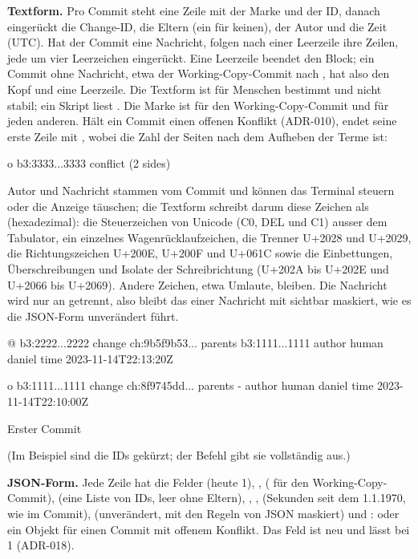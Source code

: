 {\bf Textform.} Pro Commit steht eine Zeile mit der Marke und der ID, danach eingerückt die
Change-ID, die Eltern (ein \type{-} für keinen), der Autor und die Zeit (UTC).
Hat der Commit eine Nachricht, folgen nach einer Leerzeile ihre Zeilen,
jede um vier Leerzeichen eingerückt. Eine Leerzeile beendet den Block;
ein Commit ohne Nachricht, etwa der Working-Copy-Commit nach ,
hat also den Kopf und eine Leerzeile.
Die Textform ist für Menschen bestimmt und nicht stabil; ein Skript liest .
Die Marke ist  für den Working-Copy-Commit und  für jeden anderen.
Hält ein Commit einen offenen Konflikt (ADR-010), endet seine erste Zeile mit
, wobei  die Zahl der Seiten nach dem Aufheben der Terme ist:

\starttyping
o b3:3333...3333 conflict (2 sides)
\stoptyping

Autor und Nachricht stammen vom Commit und können das Terminal steuern oder die Anzeige
täuschen; die Textform schreibt darum diese Zeichen als  (hexadezimal):
die Steuerzeichen von Unicode (C0, DEL und C1) ausser dem Tabulator, ein einzelnes
Wagenrücklaufzeichen, die Trenner U+2028 und U+2029, die Richtungszeichen U+200E, U+200F
und U+061C sowie die Einbettungen, Überschreibungen und Isolate der Schreibrichtung
(U+202A bis U+202E und U+2066 bis U+2069). Andere Zeichen, etwa Umlaute, bleiben.
Die Nachricht wird nur an \type{\n} getrennt, also bleibt das \type{\r} einer Nachricht
mit \type{\r\n} sichtbar maskiert, wie es die JSON-Form unverändert führt.

\starttyping
@ b3:2222...2222
  change   ch:9b5f9b53...
  parents  b3:1111...1111
  author   human daniel
  time     2023-11-14T22:13:20Z

o b3:1111...1111
  change   ch:8f9745dd...
  parents  -
  author   human daniel
  time     2023-11-14T22:10:00Z

    Erster Commit

\stoptyping

(Im Beispiel sind die IDs gekürzt; der Befehl gibt sie vollständig aus.)

{\bf JSON-Form.} Jede Zeile hat die Felder  (heute 1), ,
 ( für den Working-Copy-Commit),  (eine Liste von IDs,
leer ohne Eltern), , ,  (Sekunden seit dem 1.1.1970,
wie im Commit),  (unverändert, mit den Regeln von JSON maskiert) und
:  oder ein Objekt  für einen Commit mit offenem
Konflikt. Das Feld ist neu und lässt  bei 1 (ADR-018).

